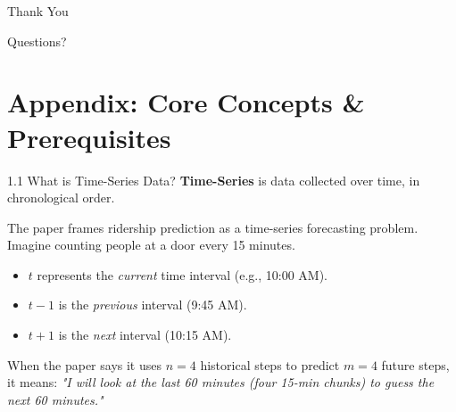 \documentclass[aspectratio=169]{beamer}
\begin{document}
\begin{frame}
\centering
\Huge Thank You

\vspace{1cm}

\Large Questions?
\end{frame}




\section{Appendix: Core Concepts \& Prerequisites}


\begin{frame}{1.1 What is Time-Series Data?}
    \textbf{Time-Series} is data collected over time, in chronological order. 

    The paper frames ridership prediction as a time-series forecasting problem. Imagine counting people at a door every 15 minutes.
    \begin{itemize}
        \item $t$ represents the \textit{current} time interval (e.g., 10:00 AM).
        \item $t-1$ is the \textit{previous} interval (9:45 AM).
        \item $t+1$ is the \textit{next} interval (10:15 AM).
    \end{itemize}

    \vspace{0.2cm}
    When the paper says it uses $n=4$ historical steps to predict $m=4$ future steps, it means:
    \textit{"I will look at the last 60 minutes (four 15-min chunks) to guess the next 60 minutes."}
\end{frame}
\end{document}
